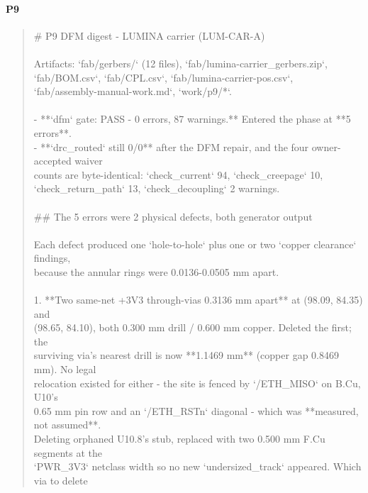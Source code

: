 \documentclass[11pt,a4paper]{article}
\begin{document}
\paragraph*{P9}
\begin{quote}\small\ttfamily\raggedright
\# P9 DFM digest - LUMINA carrier (LUM-CAR-A)\\
~\\
Artifacts: `fab/gerbers/` (12 files), `fab/lumina-carrier\_gerbers.zip`,\\
`fab/BOM.csv`, `fab/CPL.csv`, `fab/lumina-carrier-pos.csv`,\\
`fab/assembly-manual-work.md`, `work/p9/{*}`.\\
~\\
- {*}{*}`dfm` gate: PASS - 0 errors, 87 warnings.{*}{*} Entered the phase at {*}{*}5 errors{*}{*}.\\
- {*}{*}`drc\_routed` still 0/0{*}{*} after the DFM repair, and the four owner-accepted waiver\\
  counts are byte-identical: `check\_current` 94, `check\_creepage` 10,\\
  `check\_return\_path` 13, `check\_decoupling` 2 warnings.\\
~\\
\#\# The 5 errors were 2 physical defects, both generator output\\
~\\
Each defect produced one `hole-to-hole` plus one or two `copper clearance` findings,\\
because the annular rings were 0.0136-0.0505 mm apart.\\
~\\
1. {*}{*}Two same-net +3V3 through-vias 0.3136 mm apart{*}{*} at (98.09, 84.35) and\\
   (98.65, 84.10), both 0.300 mm drill / 0.600 mm copper. Deleted the first; the\\
   surviving via's nearest drill is now {*}{*}1.1469 mm{*}{*} (copper gap 0.8469 mm). No legal\\
   relocation existed for either - the site is fenced by `/ETH\_MISO` on B.Cu, U10's\\
   0.65 mm pin row and an `/ETH\_RSTn` diagonal - which was {*}{*}measured, not assumed{*}{*}.\\
   Deleting orphaned U10.8's stub, replaced with two 0.500 mm F.Cu segments at the\\
   `PWR\_3V3` netclass width so no new `undersized\_track` appeared. Which via to delete\\

\end{quote}
\end{document}
